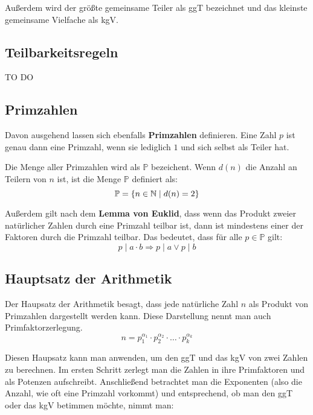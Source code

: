 \documentclass[11pt]{article}
\begin{document}
Außerdem wird der größte gemeinsame Teiler als ggT bezeichnet und das kleinste gemeinsame Vielfache als kgV.

\subsection{Teilbarkeitsregeln}
TO DO

\subsection{Primzahlen}
Davon ausgehend lassen sich ebenfalls \textbf{Primzahlen} definieren. Eine Zahl $p$ ist genau dann eine Primzahl, wenn sie
lediglich $1$ und sich selbst als Teiler hat.

Die Menge aller Primzahlen wird als $\mathbb{P}$ bezeichent. Wenn $d(n)$ die Anzahl an Teilern von $n$ ist, ist die Menge
$\mathbb{P}$ definiert als:
\[
  \mathbb{P}=\{n\in\mathbb{N} \mid d(n) = 2\}
\]

Außerdem gilt nach dem \textbf{Lemma von Euklid}, dass wenn das Produkt zweier natürlicher Zahlen durch eine Primzahl
teilbar ist, dann ist mindestens einer der Faktoren durch die Primzahl teilbar. Das bedeutet, dass für alle $p \in \mathbb{P}$
gilt:
\[
  p \mid a \cdot b \Longrightarrow p \mid a \lor p \mid b
\]

\subsection{Hauptsatz der Arithmetik}
Der Haupsatz der Arithmetik besagt, dass jede natürliche Zahl $n$ als Produkt von Primzahlen dargestellt werden kann.
Diese Darstellung nennt man auch Primfaktorzerlegung.
\[
  n = p_1^{\alpha_1} \cdot p_2^{\alpha_2} \cdot \ldots \cdot p_k^{\alpha_k}
\]


Diesen Haupsatz kann man anwenden, um den ggT und das kgV von zwei Zahlen zu berechnen. Im ersten Schritt zerlegt man die
Zahlen in ihre Primfaktoren und als Potenzen aufschreibt. Anschließend betrachtet man die Exponenten (also die Anzahl,
wie oft eine Primzahl vorkommt) und entsprechend, ob man den ggT oder das kgV betimmen möchte, nimmt man:
\ul{
}
\end{document}
